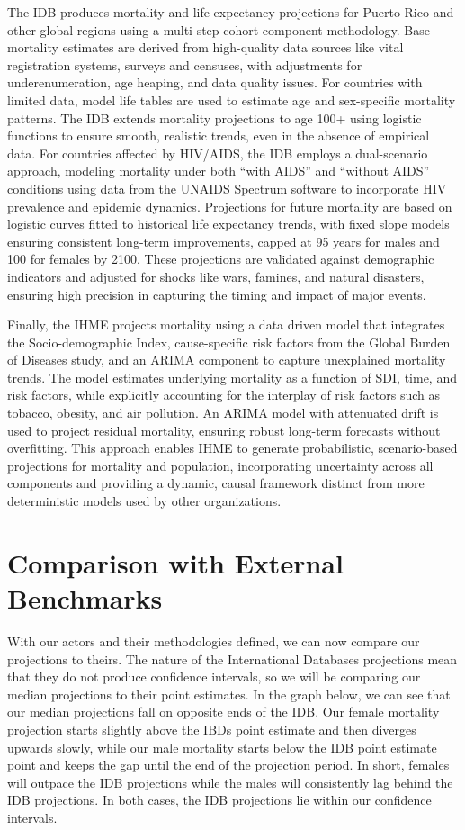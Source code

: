 \documentclass[
  12pt,
]{report}
\begin{document}
The IDB produces mortality and life expectancy projections for Puerto
Rico and other global regions using a multi-step cohort-component
methodology. Base mortality estimates are derived from high-quality data
sources like vital registration systems, surveys and censuses, with
adjustments for underenumeration, age heaping, and data quality issues.
For countries with limited data, model life tables are used to estimate
age and sex-specific mortality patterns. The IDB extends mortality
projections to age 100+ using logistic functions to ensure smooth,
realistic trends, even in the absence of empirical data. For countries
affected by HIV/AIDS, the IDB employs a dual-scenario approach, modeling
mortality under both ``with AIDS'' and ``without AIDS'' conditions using
data from the UNAIDS Spectrum software to incorporate HIV prevalence and
epidemic dynamics. Projections for future mortality are based on
logistic curves fitted to historical life expectancy trends, with fixed
slope models ensuring consistent long-term improvements, capped at 95
years for males and 100 for females by 2100. These projections are
validated against demographic indicators and adjusted for shocks like
wars, famines, and natural disasters, ensuring high precision in
capturing the timing and impact of major events.

Finally, the IHME projects mortality using a data driven model that
integrates the Socio-demographic Index, cause-specific risk factors from
the Global Burden of Diseases study, and an ARIMA component to capture
unexplained mortality trends. The model estimates underlying mortality
as a function of SDI, time, and risk factors, while explicitly
accounting for the interplay of risk factors such as tobacco, obesity,
and air pollution. An ARIMA model with attenuated drift is used to
project residual mortality, ensuring robust long-term forecasts without
overfitting. This approach enables IHME to generate probabilistic,
scenario-based projections for mortality and population, incorporating
uncertainty across all components and providing a dynamic, causal
framework distinct from more deterministic models used by other
organizations.

\section{Comparison with External
Benchmarks}\label{comparison-with-external-benchmarks}

With our actors and their methodologies defined, we can now compare our
projections to theirs. The nature of the International Databases
projections mean that they do not produce confidence intervals, so we
will be comparing our median projections to their point estimates. In
the graph below, we can see that our median projections fall on opposite
ends of the IDB. Our female mortality projection starts slightly above
the IBDs point estimate and then diverges upwards slowly, while our male
mortality starts below the IDB point estimate point and keeps the gap
until the end of the projection period. In short, females will outpace
the IDB projections while the males will consistently lag behind the IDB
projections. In both cases, the IDB projections lie within our
confidence intervals.
\end{document}

